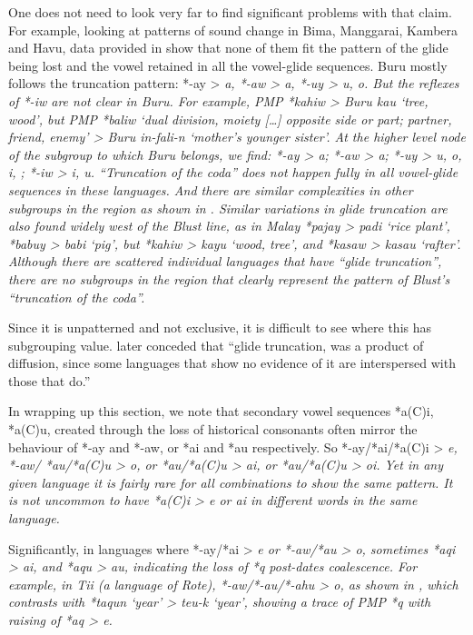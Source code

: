 One does not need to look very far to find significant problems with that claim.
For example, looking at patterns of sound change in Bima,
Manggarai, Kambera and Havu, data provided in \citet[92]{Blust2008}
show that none of them fit the pattern of the glide being lost
and the vowel retained in all the vowel-glide sequences.
Buru mostly follows the truncation pattern: *-ay > \it{a},
*-aw > \it{a}, *-uy > \it{u, o}.
But the reflexes of *-iw are not clear in Buru.
For example, PMP *kahiw > Buru \it{kau} ‘tree,
wood’, but PMP *baliw ‘dual division,
moiety [\ldots] opposite side or part; partner,
friend, enemy’
> Buru \it{in-fali-n} ‘mother’s younger sister’.
At the higher level node of the  subgroup to which
Buru belongs, we find: *-ay > \it{a}; *-aw > \it{a}; *-uy > \it{u,
o, i,} {\0}; *-iw > \it{i, u}.
“Truncation of the coda” does not happen fully in all vowel-glide
sequences in these  languages.
And there are similar complexities in other subgroups in the
region as shown in .
Similar variations in glide truncation are also found widely
west of the Blust line,
as in Malay *pajay > \it{padi} ‘rice plant’,
*babuy > \it{babi} ‘pig’,
but *kahiw > \it{kayu} ‘wood,
tree’, and *kasaw > \it{kasau} ‘rafter’.
Although there are scattered individual languages that have “glide
truncation”, there are no subgroups in the region that clearly represent the
pattern of Blust’s “truncation of the coda”.

Since it is unpatterned
and not exclusive, it is difficult to see where this has subgrouping value.
\citet[72]{Blust2009} later conceded that “glide truncation,
was a product of diffusion,
since some languages that show no evidence of it are interspersed
with those that do.”

In wrapping up this section,
we note that secondary vowel sequences *a(C)i,
*a(C)u, created through the loss of historical consonants often
mirror the behaviour of *-ay
and *-aw, or *ai and *au respectively.
So *-ay/*ai/*a(C)i > \it{e},
\mbox{*-aw}/ *au/*a(C)u > \it{o}, or *au/*a(C)u > \it{ai},
or *au/*a(C)u > \it{oi}.
Yet in any given language it is fairly rare for all combinations
to show the same pattern.
It is not uncommon to have *a(C)i > \it{e} or \it{ai} in different
words in the same language.

Significantly, in languages where *-ay/*ai > \it{e} or *-aw/*au
> \it{o}, sometimes *aqi > \it{ai},
and *aqu > \it{au},
indicating the loss of *q post-dates coalescence.
For example, in Tii (a  language of Rote),
*-aw/*-au/*-ahu > \it{o}, as shown in ,
which contrasts with *taqun ‘year’ > \it{teu-k} ‘year’,
showing a trace of PMP *q with raising of *aq > \it{e}.

